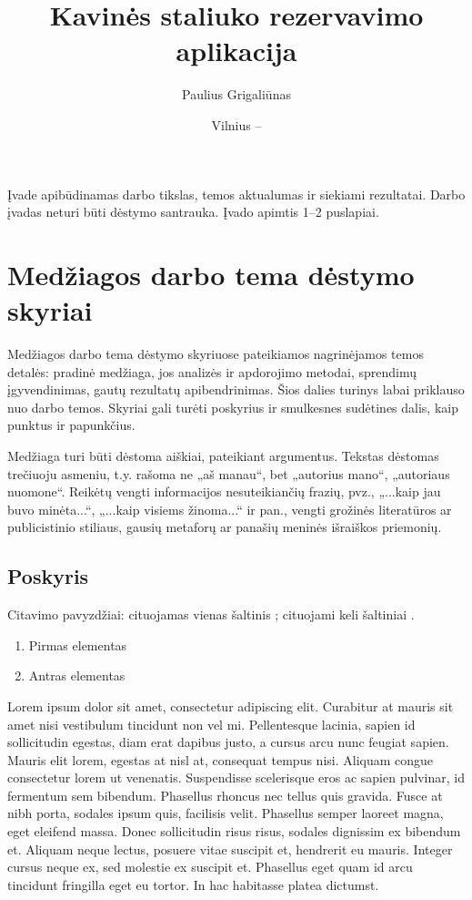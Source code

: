 \documentclass{VUMIFPSkursinis}
\title{Kavinės staliuko rezervavimo aplikacija}
\author{Paulius Grigaliūnas}
\date{Vilnius – \the\year}
\begin{document}
	
\maketitle
\cleardoublepage{}
\setcounter{page}{2}

\tableofcontents

Įvade apibūdinamas darbo tikslas, temos aktualumas ir siekiami rezultatai.
Darbo įvadas neturi būti dėstymo santrauka. Įvado apimtis 1–2 puslapiai.

\section{Medžiagos darbo tema dėstymo skyriai}
Medžiagos darbo tema dėstymo skyriuose pateikiamos nagrinėjamos temos detalės:
pradinė medžiaga, jos analizės ir apdorojimo metodai, sprendimų įgyvendinimas,
gautų rezultatų apibendrinimas. Šios dalies turinys labai priklauso nuo darbo
temos. Skyriai gali turėti poskyrius ir smulkesnes sudėtines dalis, kaip
punktus ir papunkčius.

Medžiaga turi būti dėstoma aiškiai, pateikiant argumentus. Tekstas dėstomas
trečiuoju asmeniu, t.y. rašoma ne „aš manau“, bet „autorius mano“, „autoriaus
nuomone“. Reikėtų vengti informacijos nesuteikiančių frazių, pvz., „...kaip jau
buvo minėta...“, „...kaip visiems žinoma...“ ir pan., vengti grožinės literatūros
ar publicistinio stiliaus, gausių metaforų ar panašių meninės išraiškos
priemonių.

\subsection{Poskyris}
Citavimo pavyzdžiai: cituojamas vienas šaltinis \cite{PvzStraipsnLt}; cituojami
keli šaltiniai \cite{PvzStraipsnEn, PvzKonfLt, PvzKonfEn, PvzKnygLt, PvzKnygEn,
PvzElPubLt, PvzElPubEn, PvzMagistrLt, PvzPhdEn}.

\begin{enumerate}
	\item Pirmas elementas
	\item Antras elementas
\end{enumerate}

Lorem ipsum dolor sit amet, consectetur adipiscing elit. Curabitur at mauris sit amet nisi vestibulum tincidunt non vel mi. Pellentesque lacinia, sapien id sollicitudin egestas, diam erat dapibus justo, a cursus arcu nunc feugiat sapien. Mauris elit lorem, egestas at nisl at, consequat tempus nisi. Aliquam congue consectetur lorem ut venenatis. Suspendisse scelerisque eros ac sapien pulvinar, id fermentum sem bibendum. Phasellus rhoncus nec tellus quis gravida. Fusce at nibh porta, sodales ipsum quis, facilisis velit. Phasellus semper laoreet magna, eget eleifend massa. Donec sollicitudin risus risus, sodales dignissim ex bibendum et. Aliquam neque lectus, posuere vitae suscipit et, hendrerit eu mauris. Integer cursus neque ex, sed molestie ex suscipit et. Phasellus eget quam id arcu tincidunt fringilla eget eu tortor. In hac habitasse platea dictumst.
\end{document}
